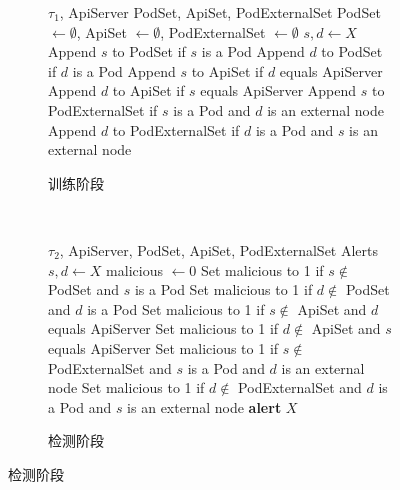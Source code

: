 {\begin{figure}[t]
    \centering
    \begin{subfigure}[b]{1.0\textwidth}
        \hrulefill
        \begin{algorithmic}[1]
            \Require $\tau_1$, ApiServer
            \Ensure PodSet, ApiSet, PodExternalSet
                \State PodSet $\gets \emptyset$, ApiSet $\gets \emptyset$, PodExternalSet $\gets \emptyset$
                    \State $s, d \gets X$
                    \State Append $s$ to PodSet if $s$ is a Pod
                    \State Append $d$ to PodSet if $d$ is a Pod
                    \State Append $s$ to ApiSet if $d$ equals ApiServer
                    \State Append $d$ to ApiSet if $s$ equals ApiServer
                    \State Append $s$ to PodExternalSet if $s$ is a Pod and $d$ is an external node
                    \State Append $d$ to PodExternalSet if $d$ is a Pod and $s$ is an external node
                \EndFor
            \EndFunction
            \end{algorithmic}
        \hrulefill
        \caption{训练阶段}
    \end{subfigure}
    \\
    \begin{subfigure}[b]{1.0\textwidth}
        \hrulefill
            \begin{algorithmic}[1]
            \Require $\tau_2$, ApiServer, PodSet, ApiSet, PodExternalSet
            \Ensure Alerts
                    \State $s, d \gets X$
                    \State malicious $\gets 0$
                    \State Set malicious to 1 if $s \notin$ PodSet and $s$ is a Pod
                    \State Set malicious to 1 if $d \notin$ PodSet and $d$ is a Pod
                    \State Set malicious to 1 if $s \notin$ ApiSet and $d$ equals ApiServer
                    \State Set malicious to 1 if $d \notin$ ApiSet and $s$ equals ApiServer
                    \State Set malicious to 1 if $s \notin$ PodExternalSet and $s$ is a Pod and $d$ is an external node
                    \State Set malicious to 1 if $d \notin$ PodExternalSet and $d$ is a Pod and $s$ is an external node
                        \State \textbf{alert} $X$
                    \EndIf
                \EndFor
            \EndFunction
            \end{algorithmic}
        \hrulefill
        \caption{检测阶段}
    \end{subfigure}
    \label{fig:detect-topology-code}
\end{figure}

}
